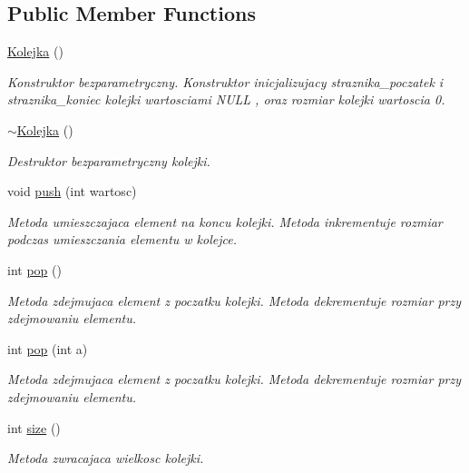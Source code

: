 \subsection*{Public Member Functions}
\begin{DoxyCompactItemize}
\item 
\hyperlink{a00013_a37c886fdc73dce62b04da0381dec5484}{Kolejka} ()
\begin{DoxyCompactList}\small\item\em Konstruktor bezparametryczny. Konstruktor inicjalizujacy straznika\+\_\+poczatek i straznika\+\_\+koniec kolejki wartosciami N\+U\+L\+L , oraz rozmiar kolejki wartoscia 0. \end{DoxyCompactList}\item 
\hyperlink{a00013_a352f86ff08cd47be6c35c60bb0f873a6}{$\sim$\+Kolejka} ()
\begin{DoxyCompactList}\small\item\em Destruktor bezparametryczny kolejki. \end{DoxyCompactList}\item 
void \hyperlink{a00013_a694333b4323d9b6d2aa84297610ef56c}{push} (int wartosc)
\begin{DoxyCompactList}\small\item\em Metoda umieszczajaca element na koncu kolejki. Metoda inkrementuje rozmiar podczas umieszczania elementu w kolejce. \end{DoxyCompactList}\item 
int \hyperlink{a00013_aa99d7c7459116c2331b301637b45b666}{pop} ()
\begin{DoxyCompactList}\small\item\em Metoda zdejmujaca element z poczatku kolejki. Metoda dekrementuje rozmiar przy zdejmowaniu elementu. \end{DoxyCompactList}\item 
int \hyperlink{a00013_adadba6a864612c187a85a5ee7eed653f}{pop} (int a)
\begin{DoxyCompactList}\small\item\em Metoda zdejmujaca element z poczatku kolejki. Metoda dekrementuje rozmiar przy zdejmowaniu elementu. \end{DoxyCompactList}\item 
int \hyperlink{a00013_a82920d7b90e967a4d5e175a20fe6de68}{size} ()
\begin{DoxyCompactList}\small\item\em Metoda zwracajaca wielkosc kolejki. \end{DoxyCompactList}\end{DoxyCompactItemize}


